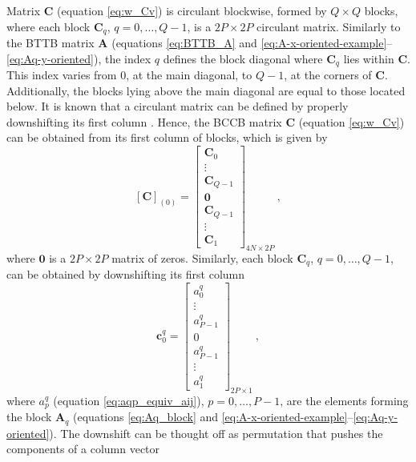 \documentclass[manuscript,revised]{geophysics}
\begin{document}
Matrix $\mathbf{C}$ (equation \ref{eq:w_Cv})
is circulant blockwise, formed by $Q \times Q$ blocks, where
each block $\mathbf{C}_{q}$, $q = 0, \dots, Q-1$, is a $2P \times 2P$ circulant matrix. 
Similarly to the BTTB matrix $\mathbf{A}$ (equations \ref{eq:BTTB_A} and 
\ref{eq:A-x-oriented-example}--\ref{eq:Aq-y-oriented}), 
the index $q$ defines the block diagonal where $\mathbf{C}_{q}$ lies 
within $\mathbf{C}$. This index varies from $0$, at the main diagonal, to $Q - 1$, at
the corners of $\mathbf{C}$. Additionally, the blocks lying 
above the main diagonal are equal to those located below.
It is known that a circulant matrix can be defined by properly downshifting 
its first column \citep[][ p. 221]{golub-vanloan2013}. Hence, the BCCB matrix $\mathbf{C}$ 
(equation \ref{eq:w_Cv}) can be obtained from its 
first column of blocks, which is given by
\begin{equation}
\left[\mathbf{C} \right]_{(0)} = 
	\begin{bmatrix}
	\mathbf{C}_{0} \\
	\vdots \\
	\mathbf{C}_{Q-1} \\
	\mathbf{0} \\
	\mathbf{C}_{Q-1} \\
	\vdots \\
	\mathbf{C}_{1}
	\end{bmatrix}_{4N \times 2P} \: ,
	\label{eq:C-first-column-blocks}
\end{equation}
where $\mathbf{0}$ is a $2P \times 2P$ matrix of zeros. Similarly, each block 
$\mathbf{C}_{q}$, $q = 0, \dots, Q-1$, can be obtained by downshifting its first 
column
\begin{equation}
\mathbf{c}^{q}_{0} = 
	\begin{bmatrix}
		a^{q}_{0} \\
		\vdots \\
		a^{q}_{P-1} \\
		0 \\
		a^{q}_{P-1} \\
		\vdots \\
		a^{q}_{1}
	\end{bmatrix}_{2P \times 1} \: ,
	\label{eq:Cq-first-column}
\end{equation}
where $a^{q}_{p}$ (equation \ref{eq:aqp_equiv_aij}), $p = 0, \dots, P-1$, are the elements 
forming the block $\mathbf{A}_{q}$ (equations \ref{eq:Aq_block} and 
\ref{eq:A-x-oriented-example}--\ref{eq:Aq-y-oriented}).
The downshift can be thought off as permutation that pushes the components of a column vector 
\end{document}
